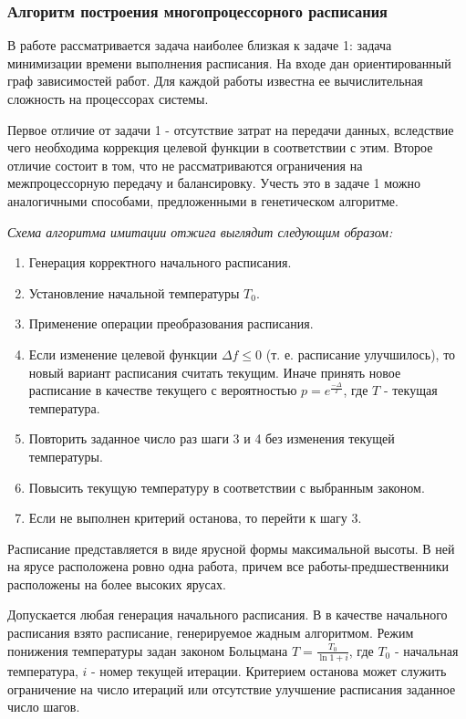 \documentclass{article}
\begin{document}
\subsubsection{Алгоритм построения многопроцессорного расписания}
В работе \cite{Kalashnikov_2008} рассматривается задача наиболее близкая к задаче 1: задача минимизации времени выполнения расписания. На входе дан ориентированный граф зависимостей работ. Для каждой работы известна ее вычислительная сложность на процессорах системы. \par
Первое отличие от задачи 1 - отсутствие затрат на передачи данных, вследствие чего необходима коррекция целевой функции в соответствии с этим. Второе отличие состоит в том, что не рассматриваются ограничения на межпроцессорную передачу и балансировку. Учесть это в задаче 1 можно аналогичными способами, предложенными в генетическом алгоритме. \par
\textit{Схема алгоритма имитации отжига выглядит следующим образом:}
\begin{enumerate}
  \item Генерация корректного начального расписания.
  \item Установление начальной температуры $T_0$.
  \item Применение операции преобразования расписания.
  \item Если изменение целевой функции $\Delta f \leq 0$ (т. е. расписание улучшилось), то новый вариант расписания считать текущим.
        Иначе принять новое расписание в качестве текущего с вероятностью $p = e^{\frac{-\Delta}{T}}$, где $T$ - текущая температура.
  \item Повторить заданное число раз шаги 3 и 4 без изменения текущей температуры.
  \item Повысить текущую температуру в соответствии с выбранным законом.
  \item Если не выполнен критерий останова, то перейти к шагу 3.
\end{enumerate}
Расписание представляется в виде ярусной формы максимальной высоты. В ней на ярусе расположена ровно одна работа, причем все работы-предшественники расположены на более высоких ярусах. \par
Допускается любая генерация начального расписания. В \cite{Kalashnikov_2008} в качестве начального расписания взято расписание, генерируемое жадным алгоритмом. Режим понижения температуры задан законом Больцмана $T = \frac{T_0}{\ln{1+i}}$, где $T_0$ - начальная температура, $i$ - номер текущей итерации. Критерием останова может служить ограничение на число итераций или отсутствие улучшение расписания заданное число шагов. \par
\end{document}
